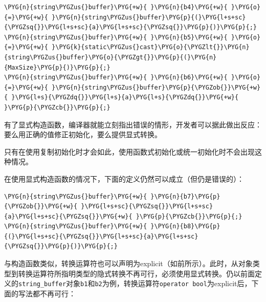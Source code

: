 \begin{codeblockbg}
\begin{Verbatim}[commandchars=\\\{\},breaklines=true,breakanywhere=true,fontsize=\codefont,xleftmargin=17bp]
\PYG{n}{string\PYGZus{}buffer}\PYG{+w}{ }\PYG{n}{b4}\PYG{+w}{ }\PYG{o}{=}\PYG{+w}{ }\PYG{n}{string\PYGZus{}buffer}\PYG{p}{(}\PYG{l+s+sc}{\PYGZsq{}}\PYG{l+s+sc}{a}\PYG{l+s+sc}{\PYGZsq{}}\PYG{p}{)}\PYG{p}{;}
\PYG{n}{string\PYGZus{}buffer}\PYG{+w}{ }\PYG{n}{b5}\PYG{+w}{ }\PYG{o}{=}\PYG{+w}{ }\PYG{k}{static\PYGZus{}cast}\PYG{o}{\PYGZlt{}}\PYG{n}{string\PYGZus{}buffer}\PYG{o}{\PYGZgt{}}\PYG{p}{(}\PYG{n}{MaxSize}\PYG{p}{)}\PYG{p}{;}
\PYG{n}{string\PYGZus{}buffer}\PYG{+w}{ }\PYG{n}{b6}\PYG{+w}{ }\PYG{o}{=}\PYG{+w}{ }\PYG{n}{string\PYGZus{}buffer}\PYG{p}{\PYGZob{}}\PYG{+w}{ }\PYG{l+s}{\PYGZdq{}}\PYG{l+s}{a}\PYG{l+s}{\PYGZdq{}}\PYG{+w}{ }\PYG{p}{\PYGZcb{}}\PYG{p}{;}
\end{Verbatim}
\end{codeblockbg}



有了显式构造函数，编译器就能立刻指出错误的情形，开发者可以据此做出反应：要么用正确的值修正初始化，要么提供显式转换。



\begin{myNote}[tip]
只有在使用复制初始化时才会如此，使用函数式初始化或统一初始化时不会出现这种情况。
\end{myNote}



在使用显式构造函数的情况下，下面的定义仍然可以成立（但仍是错误的）：



\begin{codeblockbg}
\begin{Verbatim}[commandchars=\\\{\},breaklines=true,breakanywhere=true,fontsize=\codefont,xleftmargin=17bp]
\PYG{n}{string\PYGZus{}buffer}\PYG{+w}{ }\PYG{n}{b7}\PYG{p}{\PYGZob{}}\PYG{+w}{ }\PYG{l+s+sc}{\PYGZsq{}}\PYG{l+s+sc}{a}\PYG{l+s+sc}{\PYGZsq{}}\PYG{+w}{ }\PYG{p}{\PYGZcb{}}\PYG{p}{;}
\PYG{n}{string\PYGZus{}buffer}\PYG{+w}{ }\PYG{n}{b8}\PYG{p}{(}\PYG{l+s+sc}{\PYGZsq{}}\PYG{l+s+sc}{a}\PYG{l+s+sc}{\PYGZsq{}}\PYG{p}{)}\PYG{p}{;}
\end{Verbatim}
\end{codeblockbg}



与构造函数类似，转换运算符也可以声明为explicit（如前所示）。此时，从对象类型到转换运算符所指明类型的隐式转换不再可行，必须使用显式转换。仍以前面定义的\texttt{string\_\allowbreak{}buffer}对象\texttt{b1}和\texttt{b2}为例，转换运算符\texttt{operator bool}为explicit后，下面的写法都不再可行：


